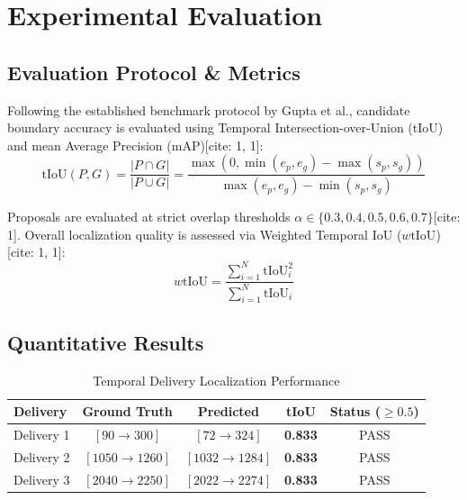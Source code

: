 ﻿\documentclass[10pt,journal,compsoc]{IEEEtran}
\begin{document}
\section{Experimental Evaluation}

\subsection{Evaluation Protocol \& Metrics}
Following the established benchmark protocol by Gupta et al., candidate boundary accuracy is evaluated using Temporal Intersection-over-Union (tIoU) and mean Average Precision (mAP)[cite: 1, 1]:
\begin{equation}
\text{tIoU}(P, G) = \frac{|P \cap G|}{|P \cup G|} = \frac{\max(0, \min(e_p, e_g) - \max(s_p, s_g))}{\max(e_p, e_g) - \min(s_p, s_g)}
\end{equation}

Proposals are evaluated at strict overlap thresholds $\alpha \in \{0.3, 0.4, 0.5, 0.6, 0.7\}$[cite: 1]. Overall localization quality is assessed via Weighted Temporal IoU ($w\text{tIoU}$)[cite: 1, 1]:
\begin{equation}
w\text{tIoU} = \frac{\sum_{i=1}^N \text{tIoU}_i^2}{\sum_{i=1}^N \text{tIoU}_i}
\end{equation}

\subsection{Quantitative Results}

\begin{table}[h]
\centering
\caption{Temporal Delivery Localization Performance}
\label{tab:tiou_results}
\begin{tabular}{lcccc}
\toprule
\textbf{Delivery} & \textbf{Ground Truth} & \textbf{Predicted} & \textbf{tIoU} & \textbf{Status ($\ge 0.5$)} \\
\midrule
Delivery 1 & $[90 \rightarrow 300]$ & $[72 \rightarrow 324]$ & \textbf{0.833} & PASS \\
Delivery 2 & $[1050 \rightarrow 1260]$ & $[1032 \rightarrow 1284]$ & \textbf{0.833} & PASS \\
Delivery 3 & $[2040 \rightarrow 2250]$ & $[2022 \rightarrow 2274]$ & \textbf{0.833} & PASS \\
\bottomrule
\end{tabular}
\end{table}
\end{document}
